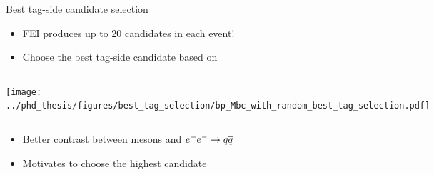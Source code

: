 \documentclass[xcolor=dvipsnames]{beamer}
\begin{document}
\begin{frame}{Best tag-side candidate selection}
   \scriptsize\centering
      \begin{itemize}
         \item    FEI produces up to 20 candidates in each event!
         \item[\ra] Choose the best tag-side candidate based on \feiProb
      \end{itemize}
   
   \begin{columns}
      \centering
      \texttt{[image: ../phd\_thesis/figures/best\_tag\_selection/bp\_Mbc\_with\_random\_best\_tag\_selection.pdf]}
      \centering
   
   \end{columns}
   
   \begin{itemize}
      \item[\ra] Better contrast between \B mesons and $e^+e^-\rightarrow q\overline q$
      \item Motivates to choose the highest \feiProb candidate
   \end{itemize}
   
   \end{frame}
\end{document}
